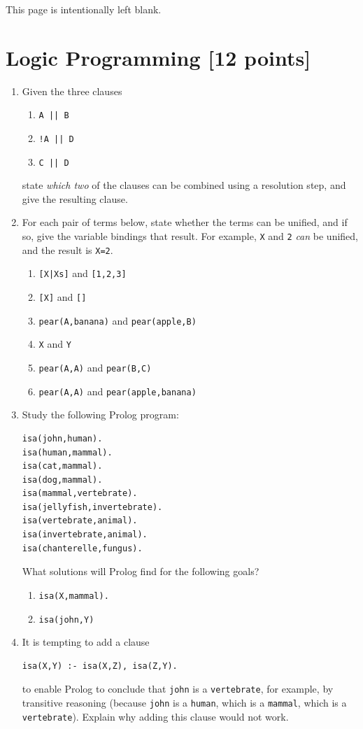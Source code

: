 \documentclass{article}
\begin{document}
\newpage
This page is intentionally left blank.
\newpage
\section{Logic Programming [12 points]}

\begin{enumerate}
\item
Given the three clauses
\begin{enumerate}
\item \verb!A || B!
\item \verb?!A || D?
\item \verb!C || D!
\end{enumerate}
state {\em which two} of the clauses can be combined using a resolution step, and give the resulting clause.

\item
For each pair of terms below, state whether the terms can be unified,
and if so, give the variable bindings that result. For example,
\verb!X! and \verb!2! {\em can} be unified, and the result is
\verb!X=2!.
\begin{enumerate}
\item \verb![X|Xs]! and \verb![1,2,3]!
\item \verb![X]! and \verb![]!
\item \verb!pear(A,banana)! and \verb!pear(apple,B)!
\item \verb!X! and \verb!Y!
\item \verb!pear(A,A)! and \verb!pear(B,C)!
\item \verb!pear(A,A)! and \verb!pear(apple,banana)!
\end{enumerate}

\item
Study the following Prolog program:
\begin{verbatim}
isa(john,human).
isa(human,mammal).
isa(cat,mammal).
isa(dog,mammal).
isa(mammal,vertebrate).
isa(jellyfish,invertebrate).
isa(vertebrate,animal).
isa(invertebrate,animal).
isa(chanterelle,fungus).
\end{verbatim}
What solutions will Prolog find for the following goals?
\begin{enumerate}
\item
\verb!isa(X,mammal).!
\item
\verb!isa(john,Y)!
\end{enumerate}

\item
It is tempting to add a clause
\begin{verbatim}
isa(X,Y) :- isa(X,Z), isa(Z,Y).
\end{verbatim}
to enable Prolog to conclude that \verb!john! is a \verb!vertebrate!,
for example, by transitive reasoning (because \verb!john! is a
\verb!human!, which is a \verb!mammal!, which is a
\verb!vertebrate!). Explain why adding this clause would not work.


\end{enumerate}
\end{document}
